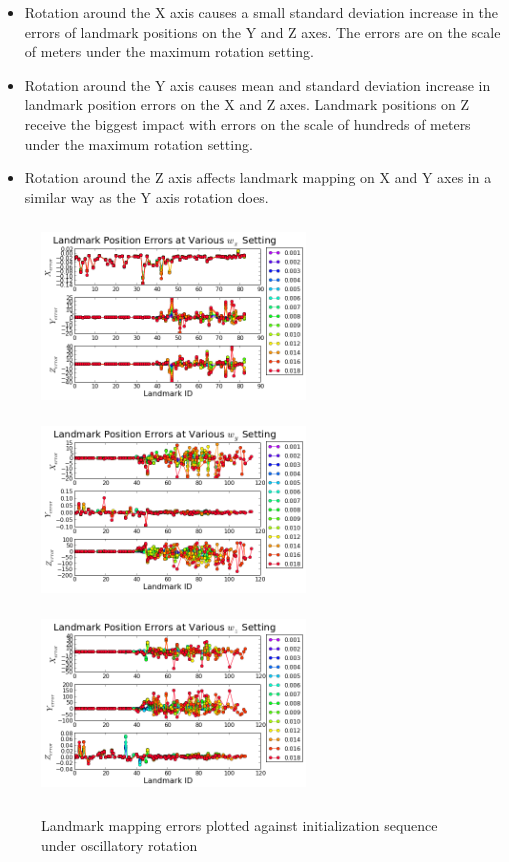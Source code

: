 \begin{itemize}
  \item Rotation around the X axis causes a small standard deviation
  increase in the errors of landmark positions on the Y and Z axes.
  The errors are on the scale of meters under the maximum rotation
  setting.
  \item Rotation around the Y axis causes mean and standard deviation
  increase in landmark position errors on the X and Z axes. Landmark
  positions on Z receive the biggest impact with errors on the scale
  of hundreds of meters under the maximum rotation setting.
  \item Rotation around the Z axis affects landmark mapping on X and Y
  axes in a similar way as the Y axis rotation does.
\end{itemize}
\FloatBarrier
\begin{figure}[h]
  \centering
  \includegraphics[width=7cm, height=5cm]{./Figures/SimulationFigures/Figure17.png}
  \includegraphics[width=7cm, height=5cm]{./Figures/SimulationFigures/Figure18.png}
  \includegraphics[width=7cm, height=5cm]{./Figures/SimulationFigures/Figure19.png}
  \caption{Landmark mapping errors plotted against initialization sequence under oscillatory rotation}
  \label{fig:simfig17-19}
\end{figure}

